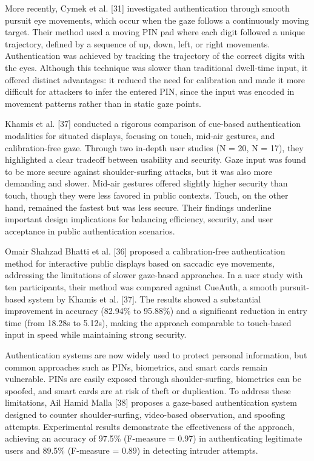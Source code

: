 \documentclass[12pt]{report}
\begin{document}
More recently, Cymek et al. [31] investigated authentication through smooth pursuit eye movements, which occur when the gaze follows a continuously moving target.
Their method used a moving PIN pad where each digit followed a unique trajectory, defined by a sequence of up, down, left, or right movements.
Authentication was achieved by tracking the trajectory of the correct digits with the eyes. 
Although this technique was slower than traditional dwell-time input, it offered distinct advantages: it reduced the need for calibration and made it more difficult for attackers to infer the entered PIN, since the input was encoded in movement patterns rather than in static gaze points.

Khamis et al. [37] conducted a rigorous comparison of cue-based authentication modalities for situated displays, focusing on touch, mid-air gestures, and calibration-free gaze. 
Through two in-depth user studies (N = 20, N = 17), they highlighted a clear tradeoff between usability and security. 
Gaze input was found to be more secure against shoulder-surfing attacks, but it was also more demanding and slower.
Mid-air gestures offered slightly higher security than touch, though they were less favored in public contexts.
Touch, on the other hand, remained the fastest but was less secure.
Their findings underline important design implications for balancing efficiency, security, and user acceptance in public authentication scenarios.

Omair Shahzad Bhatti et al. [36] proposed a calibration-free authentication method for interactive public displays based on saccadic eye movements, addressing the limitations of slower gaze-based approaches. 
In a user study with ten participants, their method was compared against CueAuth, a smooth pursuit-based system by Khamis et al. [37].
The results showed a substantial improvement in accuracy (82.94\% to 95.88\%) and a significant reduction in entry time (from 18.28s to 5.12s), making the approach comparable to touch-based input in speed while maintaining strong security.

Authentication systems are now widely used to protect personal information, but common approaches such as PINs, biometrics, and smart cards remain vulnerable. 
PINs are easily exposed through shoulder-surfing, biometrics can be spoofed, and smart cards are at risk of theft or duplication. 
To address these limitations, Ail Hamid Malla [38] proposes a gaze-based authentication system designed to counter shoulder-surfing, video-based observation, and spoofing attempts.
Experimental results demonstrate the effectiveness of the approach, achieving an accuracy of 97.5\% (F-measure = 0.97) in authenticating legitimate users and 89.5\% (F-measure = 0.89) in detecting intruder attempts.
\end{document}
